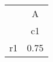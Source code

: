 \begin{tabular}{l*{1}{c}}
\hline\hline
            &           A\\
            &          c1\\
\hline
r1          &        0.75\\
\hline\hline
\end{tabular}
